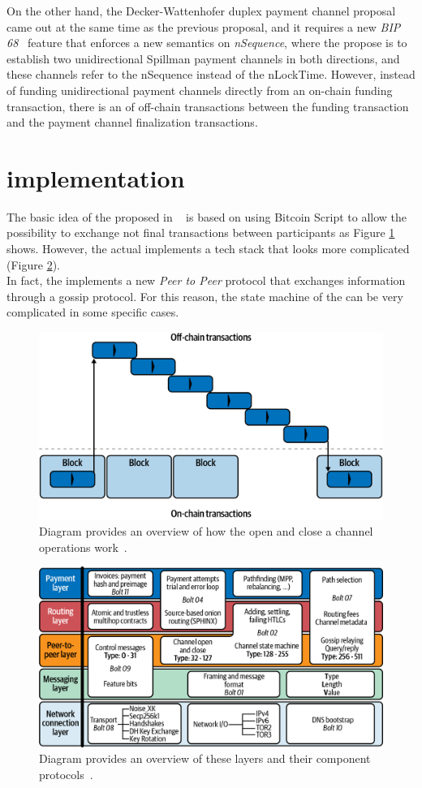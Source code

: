 On the other hand, the Decker-Wattenhofer duplex payment channel proposal came out at the same time as the previous proposal, and
it requires a new \emph{BIP 68}~\cite{bip68} feature that enforces a new semantics on \emph{nSequence}, where the propose is to
establish two unidirectional Spillman payment channels in both
directions, and these channels refer to the nSequence instead of the nLockTime.
However, instead of funding unidirectional payment channels directly from an on-chain funding transaction, there is 
an  of off-chain transactions between the funding transaction and the payment channel finalization transactions.

\section{{\LN} implementation}

The basic idea of the {\LN} proposed in ~\cite{lightning-network-paper} is based on using Bitcoin Script
to allow the possibility to exchange not final transactions between participants as Figure \ref{fig:ln-onchain} shows.
However, the actual {\LN} implements a tech stack that looks more complicated (Figure \ref{fig:lightning-stack}).\\
In fact, the {\LN} implements a new \emph{Peer to Peer} protocol that exchanges information through
a gossip protocol. For this reason, the state machine of the {\LN}
can be very complicated in some specific cases.

\begin{figure}[h]
  \begin{center}
  \includegraphics[width=0.6\columnwidth]{imgs/mtln_0702.png}
  \end{center}
    \caption{Diagram provides an overview of how the open and close a channel operations work~\cite{lnbook}.}
  \label{fig:ln-onchain}
\end{figure}


\begin{figure}[h]
  \begin{center}
  \includegraphics[width=0.6\columnwidth]{imgs/mtln_0601.png}
  \end{center}
    \caption{Diagram provides an overview of these layers and their component protocols~\cite{lnbook}.}
  \label{fig:lightning-stack}
\end{figure}

